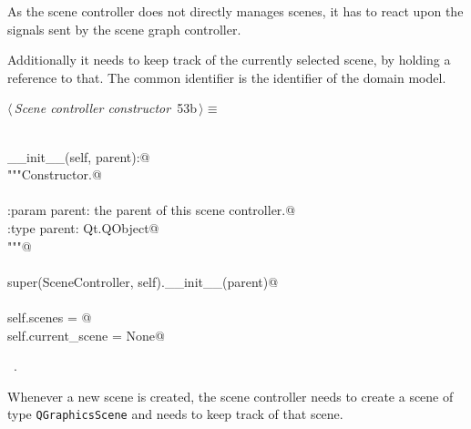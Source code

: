 \documentclass[
    a4paper,      %
    10pt,         %
    openright,    %
    notitlepage,  %
    parskip=half, %
]{scrreprt}       %
\theoremstyle{definition}                    %
\begin{document}
As the scene controller does not directly manages scenes, it has to react upon
the signals sent by the scene graph controller.

Additionally it needs to keep track of the currently selected scene, by holding
a reference to that. The common identifier is the identifier of the domain
model.

\begin{flushleft} \small
\begin{minipage}{\linewidth}\label{scrap83}\raggedright\small
{} $\langle\,${\itshape Scene controller constructor}\nobreak\ {\footnotesize {53b}}$\,\rangle\equiv$
\vspace{-1ex}
\begin{list}{}{} \item
\mbox{}\lstinline@@\\
\mbox{}\lstinline@def __init__(self, parent):@\\
\mbox{}\lstinline@    """Constructor.@\\
\mbox{}\lstinline@@\\
\mbox{}\lstinline@    :param parent: the parent of this scene controller.@\\
\mbox{}\lstinline@    :type parent: Qt.QObject@\\
\mbox{}\lstinline@    """@\\
\mbox{}\lstinline@@\\
\mbox{}\lstinline@    super(SceneController, self).__init__(parent)@\\
\mbox{}\lstinline@@\\
\mbox{}\lstinline@    self.scenes = {}@\\
\mbox{}\lstinline@    self.current_scene = None@\\
\mbox{}\lstinline@@{\NWsep}
\end{list}
\vspace{-1.5ex}
\footnotesize
\begin{list}{}{\setlength{\itemsep}{-\parsep}\setlength{\itemindent}{-\leftmargin}}
\item \NWtxtMacroRefIn\ .

\item{}
\end{list}
\end{minipage}\vspace{4ex}
\end{flushleft}
Whenever a new scene is created, the scene controller needs to create a scene of
type \verb+QGraphicsScene+ and needs to keep track of that scene.
\end{document}
